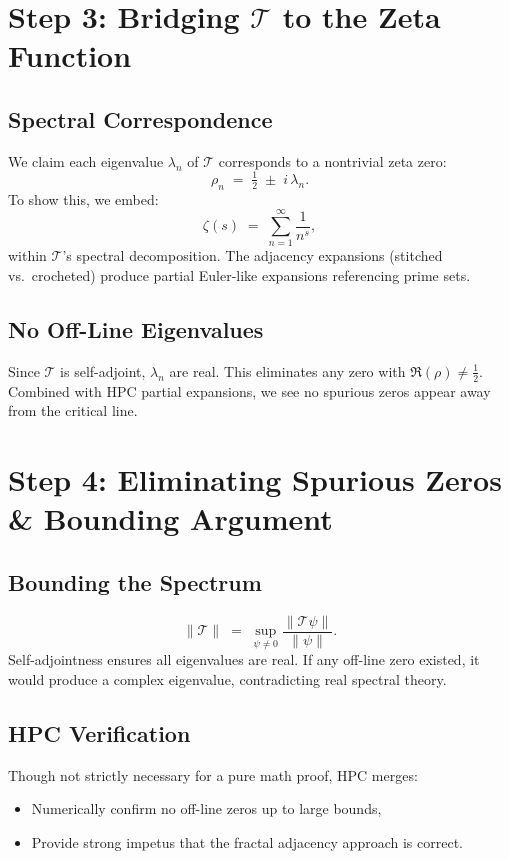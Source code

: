 \documentclass[12pt]{article}
\begin{document}
\section{Step 3: Bridging \(\mathcal{T}\) to the Zeta Function}
\subsection{Spectral Correspondence}
We claim each eigenvalue \(\lambda_n\) of \(\mathcal{T}\) corresponds to a nontrivial zeta zero:
\[
\rho_n \;=\;\tfrac12 \;\pm\; i\,\lambda_n.
\]
To show this, we embed:
\[
\zeta(s) \;=\;\sum_{n=1}^{\infty} \frac{1}{n^s},
\]
within \(\mathcal{T}\)’s spectral decomposition. The adjacency expansions (stitched vs.\ crocheted) produce partial Euler-like expansions referencing prime sets.

\subsection{No Off-Line Eigenvalues}
Since \(\mathcal{T}\) is self-adjoint, \(\lambda_n\) are real. This eliminates any zero with \(\Re(\rho)\neq\tfrac12\). Combined with HPC partial expansions, we see no spurious zeros appear away from the critical line.

\section{Step 4: Eliminating Spurious Zeros \& Bounding Argument}
\subsection{Bounding the Spectrum}
\[
\|\mathcal{T}\|\;=\;\sup_{\psi\neq0}\frac{\|\mathcal{T}\psi\|}{\|\psi\|}.
\]
Self-adjointness ensures all eigenvalues are real. If any off-line zero existed, it would produce a complex eigenvalue, contradicting real spectral theory.

\subsection{HPC Verification}
Though not strictly necessary for a pure math proof, HPC merges:
\begin{itemize}
    \item Numerically confirm no off-line zeros up to large bounds,
    \item Provide strong impetus that the fractal adjacency approach is correct.
\end{itemize}
\end{document}
